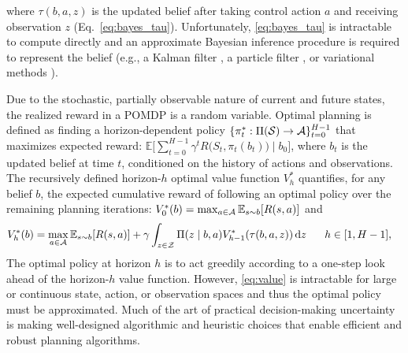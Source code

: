 where $\tau(b,a,z)$ is the updated belief after taking control action $a$ and receiving observation $z$ (Eq.~\ref{eq:bayes_tau}). Unfortunately, \cref{eq:bayes_tau} is intractable to compute directly and an approximate Bayesian inference procedure is required to represent the belief (e.g., a Kalman filter \cite{welch1995introduction}, a particle filter \cite{Silver2010}, or variational methods \cite{wainwright2002environmental,kucukelbir2017automatic}). 

Due to the stochastic, partially observable nature of current and future states, the realized reward in a POMDP is a random variable. Optimal planning is defined as finding a horizon-dependent policy $\{\pi_t^*: \Pi(\mathcal{S}) \to \mathcal{A}\}_{t=0}^{H-1}$ that maximizes expected reward: $\mathbb{E} \Big[ \sum_{t=0}^{H-1} \gamma^t R\big(S_t, \pi_t(b_t)\big) \mid b_0 \Big]$, where $b_t$ is the updated belief at time $t$, conditioned on the history of actions and observations. The recursively defined horizon-$h$ optimal value function $V^*_h$ quantifies, for any belief $b$, the expected cumulative reward of following an optimal policy over the remaining planning iterations: $V_0^{*}(b) = \operatorname*{max}_{a \in \mathcal{A}} \mathbb{E}_{s \sim b}[R(s, a)]$ and
\begin{align}
     V_h^{*}(b) &=  \max_{a \in \mathcal{A}} \mathbb{E}_{s \sim b}[R(s, a)] + \gamma \int_{z \in \mathcal{Z}} \Pi(z \mid b, a) V_{h-1}^*(\tau(b, a,z)) \, \text{d}z \hspace{0.6cm} h \in [1, H-1],
    \label{eq:value}
\end{align}
The optimal policy at horizon $h$ is to act greedily according to a one-step look ahead of the horizon-$h$ value function. However, \cref{eq:value} is intractable for large or continuous state, action, or observation spaces and thus the optimal policy must be approximated. Much of the art of practical decision-making uncertainty is making well-designed algorithmic and heuristic choices that enable efficient and robust planning algorithms.


